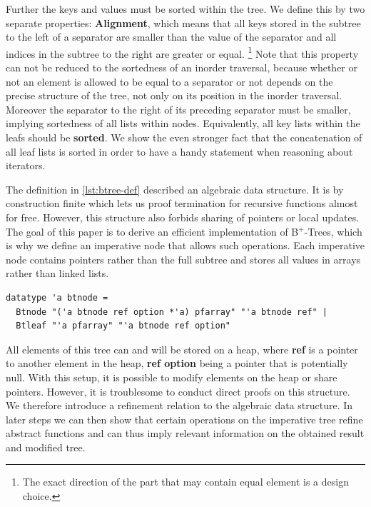 \documentclass[a4paper,UKenglish,cleveref, autoref, thm-restate]{lipics-v2021}
\newcommand{\btrees}{B$^+$-Trees}
\begin{document}
Further the keys and values must be sorted within the tree.
We define this by two separate properties: \textbf{Alignment}, which means that all keys stored
in the subtree to the left of a separator are smaller than the value of the separator
and all indices in the subtree to the right are greater or equal.
\footnote{
    The exact direction of the part that may contain equal element is a design choice.
}
Note that this property can not be reduced to the sortedness of an inorder traversal,
because whether or not an element is allowed to be equal to a separator or not
depends on the precise structure of the tree, not only on its position in the inorder traversal.
Moreover the separator to the right of its preceding separator must be smaller,
implying sortedness of all lists within nodes.
Equivalently, all key lists within the leafs should be \textbf{sorted}.
We show the even stronger fact that the concatenation of all leaf lists
is sorted in order to have a handy statement when reasoning about iterators.


The definition in \autoref{lst:btree-def} described an algebraic data structure.
It is by construction finite which lets us proof termination for recursive functions almost for free.
However, this structure also forbids sharing of pointers or local updates.
The goal of this paper is to derive an efficient implementation
of \btrees, which is why we define an imperative node that allows such operations.
Each imperative node contains pointers rather than the full subtree and
stores all values in arrays rather than linked lists.

\begin{lstlisting}[mathescape=true, language=Isabelle,label=lst:btree-imp-def]
datatype 'a btnode =
  Btnode "('a btnode ref option *'a) pfarray" "'a btnode ref" |
  Btleaf "'a pfarray" "'a btnode ref option"
\end{lstlisting}

All elements of this tree can and will be stored on a heap, where \textbf{ref} is a pointer
to another element in the heap, \textbf{ref option} being a pointer that is potentially null.
With this setup, it is possible to modify elements on the heap or share pointers.
However, it is troublesome to conduct direct proofs on this structure.
We therefore introduce a refinement relation to the algebraic data structure.
In later steps we can then show that certain operations on the imperative
tree refine abstract functions and can thus imply relevant information on the obtained result and modified tree.
\end{document}
